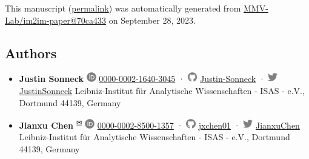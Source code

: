 This manuscript
(\href{https://MMV-Lab.github.io/im2im-paper/v/70ca43307d46352195ff4a7e7a8292144b340afb/}{permalink})
was automatically generated
from \href{https://github.com/MMV-Lab/im2im-paper/tree/70ca43307d46352195ff4a7e7a8292144b340afb}{MMV-Lab/im2im-paper@70ca433}
on September 28, 2023.

\hypertarget{authors}{%
\subsection{Authors}\label{authors}}

\begin{itemize}
\item
  \textbf{Justin Sonneck}
  \includegraphics[width=0.16667in,height=0.16667in]{images/orcid.svg}
  \href{https://orcid.org/0000-0002-1640-3045}{0000-0002-1640-3045}
  · \includegraphics[width=0.16667in,height=0.16667in]{images/github.svg}
  \href{https://github.com/Justin-Sonneck}{Justin-Sonneck}
  · \includegraphics[width=0.16667in,height=0.16667in]{images/twitter.svg}
  \href{https://twitter.com/JustinSonneck}{JustinSonneck}
  Leibniz-Institut für Analytische Wissenschaften - ISAS - e.V., Dortmund 44139, Germany
\item
  \textbf{Jianxu Chen}
  \textsuperscript{\protect\hyperlink{correspondence}{✉}}
  \includegraphics[width=0.16667in,height=0.16667in]{images/orcid.svg}
  \href{https://orcid.org/0000-0002-8500-1357}{0000-0002-8500-1357}
  · \includegraphics[width=0.16667in,height=0.16667in]{images/github.svg}
  \href{https://github.com/jxchen01}{jxchen01}
  · \includegraphics[width=0.16667in,height=0.16667in]{images/twitter.svg}
  \href{https://twitter.com/JianxuChen}{JianxuChen}
  Leibniz-Institut für Analytische Wissenschaften - ISAS - e.V., Dortmund 44139, Germany
\end{itemize}

